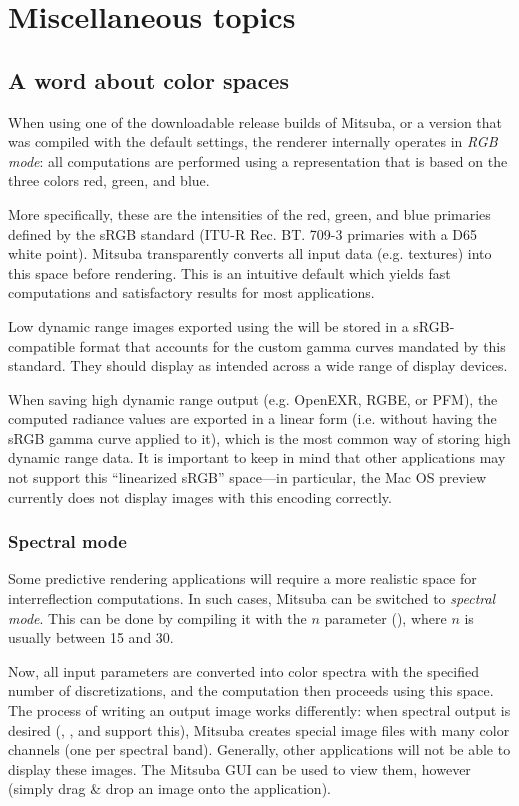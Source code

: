 \section{Miscellaneous topics}
\label{sec:miscellaneous}
\subsection{A word about color spaces}
\label{sec:colorspaces}
When using one of the downloadable release builds of Mitsuba, or a version
that was compiled with the default settings, the renderer internally
operates in \emph{RGB mode}: all computations are performed using a representation
that is based on the three colors red, green, and blue.

More specifically, these are the intensities of the red, green, and blue primaries
defined by the sRGB standard (ITU-R Rec. BT. 709-3 primaries with a D65 white point).
Mitsuba transparently converts all input data (e.g. textures) into this space before
rendering. This is an intuitive default which yields fast computations and
satisfactory results for most applications.

Low dynamic range images exported using the  will be stored in a
sRGB-compatible format that accounts for the custom gamma curves mandated by this
standard. They should display as intended across a wide range of display devices.

When saving high dynamic range output (e.g. OpenEXR, RGBE, or PFM), the computed radiance
values are exported in a linear form (i.e. without having the sRGB gamma curve applied to it),
which is the most common way of storing high dynamic range data.
It is important to keep in mind that other applications may not support this
``linearized sRGB'' space---in particular, the Mac OS preview currently
does not display images with this encoding correctly.

\subsubsection{Spectral mode}
Some predictive rendering applications will require a more realistic space for
interreflection computations. In such cases, Mitsuba can be switched to \emph{spectral mode}.
This can be done by compiling it with the $n$ parameter
(), where $n$ is usually between 15 and 30.

Now, all input parameters are converted into color spectra with the specified
number of discretizations, and the computation then proceeds using this space.
The process of writing an output image works differently: when spectral output
is desired (, , and 
support this), Mitsuba creates special image files with many color channels (one
per spectral band).
Generally, other applications will not be able to display these images. The Mitsuba GUI
can be used to view them, however (simply drag \& drop an image onto the application).

